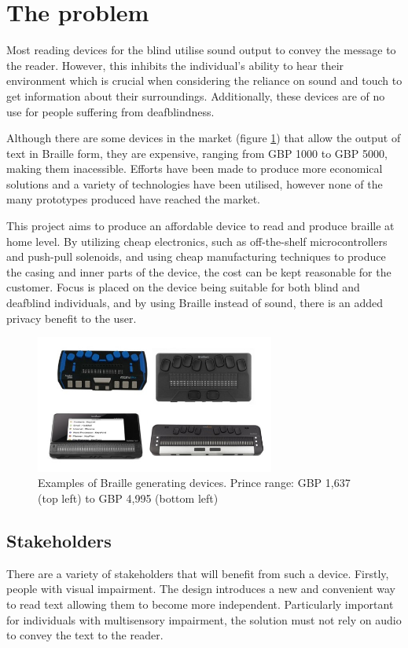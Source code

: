 \section{The problem}
Most reading devices for the blind utilise sound output to convey the message to the reader.
However, this inhibits the individual's ability to hear their environment which is crucial when considering the reliance on sound and touch to get information about their surroundings.
Additionally, these devices are of no use for people suffering from deafblindness.

Although there are some devices in the market (figure \ref{fig:braille-readers-examples}) that allow the output of text in Braille form, they are expensive, ranging from GBP 1000 to GBP 5000, making them inacessible. Efforts have been made to produce more economical solutions and a variety of technologies have been utilised, however none of the many prototypes produced have reached the market.

This project aims to produce an affordable device to read and produce braille at home level.
By utilizing cheap electronics, such as off-the-shelf microcontrollers and push-pull solenoids, and using cheap manufacturing techniques to produce the casing and inner parts of the device, the cost can be kept reasonable for the customer.
Focus is placed on the device being suitable for both blind and deafblind individuals, and by using Braille instead of sound, there is an added privacy benefit to the user.
\begin{figure}[h]
\centering
    \includegraphics[width=0.7\textwidth]{figures/braille-readers-examples.jpg}
\caption[Examples of Braille generating devices]{Examples of Braille generating devices. Prince range: GBP 1,637 (top left) to GBP 4,995 (bottom left)}
\label{fig:braille-readers-examples}
\end{figure}

\subsection{Stakeholders}
There are a variety of stakeholders that will benefit from such a device.
Firstly, people with visual impairment.
The design introduces a new and convenient way to read text allowing them to become more independent.
Particularly important for individuals with multisensory impairment, the solution must not rely on audio to convey the text to the reader.

